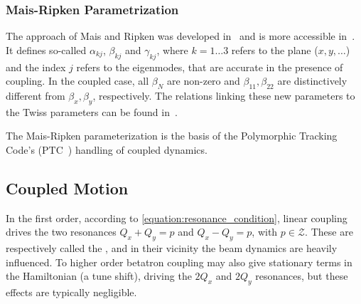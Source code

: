 \subsubsection*{Mais-Ripken Parametrization}

The approach of Mais and Ripken was developed in~\cite{REPORT:Ripken:AllGerman} and is more accessible in~\cite{AIP:Willeke:Methods_Beam_Optics, REPORT:Borchardt:Calculation_Beam_Envelopes}.
It defines so-called  \(\alpha_{kj}\), \(\beta_{kj}\) and \(\gamma_{kj}\), where \(k = 1 \ldots 3\) refers to the plane (\(x, y, \ldots\)) and the index \(j\) refers to the eigenmodes, that are accurate in the presence of coupling.
In the coupled case, all \(\beta_N\) are non-zero and \(\beta_{11}, \beta_{22}\) are distinctively different from \(\beta_x, \beta_y\), respectively.
The relations linking these new parameters to the Twiss parameters can be found in~\cite{IOP:Lebedev:Betatron_Motion_Coupling}.

The Mais-Ripken parameterization is the basis of the Polymorphic Tracking Code's (PTC~\cite{CODE:Schmidt_Forest:PTC}) handling of coupled dynamics. 

\subsection{Coupled Motion}
\label{subsection:coupled_motion}

In the first order, according to \cref{equation:resonance_condition}, linear coupling drives the two resonances \(Q_x + Q_y = p\) and \(Q_x - Q_y = p\), with \(p \in \mathcal{Z}\).
These are respectively called the , and in their vicinity the beam dynamics are heavily influenced.
To higher order betatron coupling may also give stationary terms in the Hamiltonian (a tune shift), driving the \(2 Q_x\) and \(2 Q_y\) resonances, but these effects are typically negligible.

